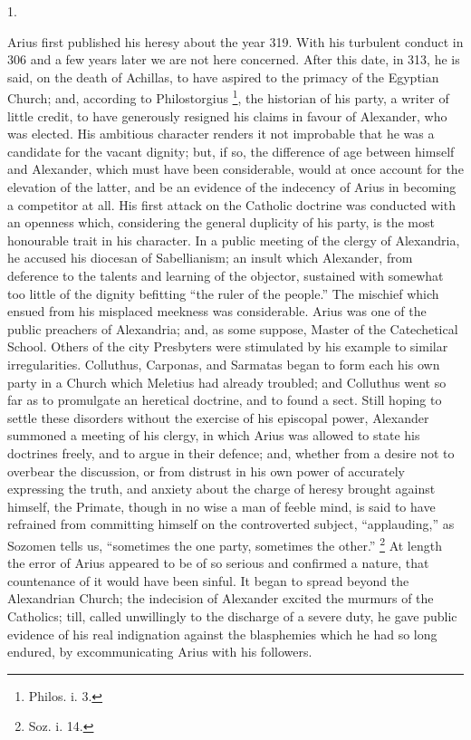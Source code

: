 1.

Arius first published his heresy about the year 319. With his
turbulent conduct in 306 and a few years later we are not here
concerned. After this date, in 313, he is said, on the death of
Achillas, to have aspired to the primacy of the Egyptian Church; and,
according to Philostorgius \footnote{Philos. i. 3.},
the historian of his party, a writer of little credit, to have
generously resigned his claims in favour of Alexander, who was
elected. His ambitious character renders it not improbable that he was
a candidate for the vacant dignity; but, if so, the difference of age
between himself and Alexander, which must have been considerable,
would at once account for the elevation of the latter, and be an
evidence of the indecency of Arius in becoming a competitor at all.
His first attack on the Catholic doctrine was conducted with an
openness which, considering the general duplicity of his party, is the
most honourable trait in his character. In a public meeting of the
clergy of Alexandria, he accused his diocesan of Sabellianism; an
insult which Alexander, from deference to the talents and learning of
the objector, sustained with somewhat too little of the dignity
befitting ``the ruler of the people.'' The mischief which
ensued from his misplaced meekness was considerable. Arius was one of
the public preachers of Alexandria; and, as some suppose, Master of
the Catechetical School. Others of the city Presbyters were stimulated
by his example to similar irregularities. Colluthus, Carponas, and
Sarmatas began to form each his own party in a Church which Meletius
had already troubled; and Colluthus went so far as to promulgate
an heretical doctrine, and to found a sect. Still hoping to settle
these disorders without the exercise of his episcopal power, Alexander
summoned a meeting of his clergy, in which Arius was allowed to state
his doctrines freely, and to argue in their defence; and, whether from
a desire not to overbear the discussion, or from distrust in his own
power of accurately expressing the truth, and anxiety about the charge
of heresy brought against himself, the Primate, though in no wise a
man of feeble mind, is said to have refrained from committing himself
on the controverted subject, ``applauding,'' as Sozomen tells
us, ``sometimes the one party, sometimes the other.'' \footnote{Soz. i. 14.} At length the error of Arius appeared to be of so serious and
confirmed a nature, that countenance of it would have been sinful. It
began to spread beyond the Alexandrian Church; the indecision of
Alexander excited the murmurs of the Catholics; till, called
unwillingly to the discharge of a severe duty, he gave public evidence
of his real indignation against the blasphemies which he had so long
endured, by excommunicating Arius with his followers.

